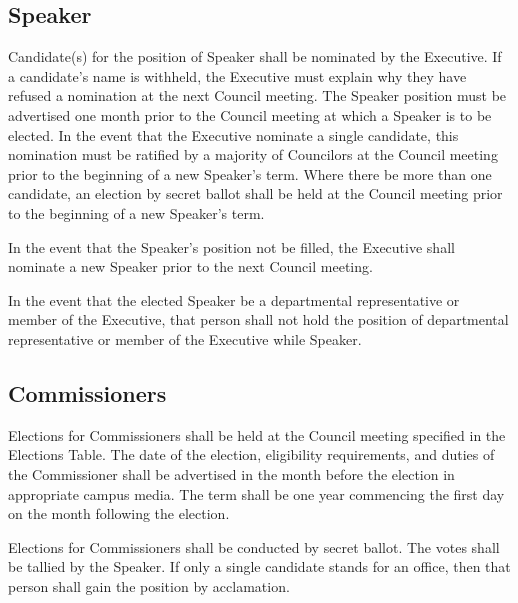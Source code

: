 \subsection{Speaker}
\begin{longenum}[ label*=\thesubsection.\arabic*., align=left]
	\item Candidate(s) for the position of Speaker shall be nominated by the Executive.    If a candidate's name is withheld, the Executive must explain why they have refused a nomination at the next Council meeting. The Speaker position must be advertised one month prior to the Council meeting at which a Speaker is to be elected.   In the event that the Executive nominate a single candidate, this nomination must be ratified by a majority of Councilors at the Council meeting prior to the beginning of a new Speaker's term. Where there be more than one candidate, an election by secret ballot shall be held at the Council meeting prior to the beginning of a new Speaker's term.
	\item In the event that the Speaker's position not be filled, the Executive shall nominate a new Speaker prior to the next Council meeting.
	 
	\item In the event that the elected Speaker be a departmental representative or member of the Executive, that person shall not hold the position of departmental representative or member of the Executive while Speaker.
\end{longenum}

\subsection{Commissioners}
\begin{longenum}[ label*=\thesubsection.\arabic*., align=left]
\item Elections for Commissioners shall be held at the Council meeting specified in the Elections Table. The date of the election, eligibility requirements, and duties of the Commissioner shall be advertised in the month before the election in appropriate campus media. The term shall be one year commencing the first day on the month following the election.
 
\item Elections for Commissioners shall be conducted by secret ballot. The votes shall be tallied by the Speaker. If only a single candidate stands for an office, then that person shall gain the position by acclamation.
 
\end{longenum}
\newpage


